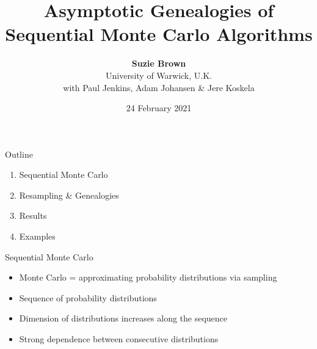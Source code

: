 \documentclass[aspectratio=169]{beamer}
\title[Genealogies of SMC Algorithms]{Asymptotic Genealogies of Sequential Monte Carlo Algorithms}
\author[Suzie Brown]{\textbf{Suzie Brown} \\[5pt] University of Warwick, U.K. \\ with Paul Jenkins, Adam Johansen \& Jere Koskela}
\date{24 February 2021}
\theoremstyle{definition}
\begin{document}
\begin{frame}
\maketitle
\end{frame}

\begin{frame}{Outline}
\begin{enumerate}
\item Sequential Monte Carlo
\item Resampling \& Genealogies
\item Results
\item Examples
\end{enumerate}
\end{frame}




\begin{frame}{Sequential Monte Carlo}
\begin{itemize}[<+->]
\item Monte Carlo = approximating probability distributions via sampling %
\item Sequence of probability distributions %
\item Dimension of distributions increases along the sequence
\item Strong dependence between consecutive distributions
\end{itemize}


\end{frame}
\end{document}
